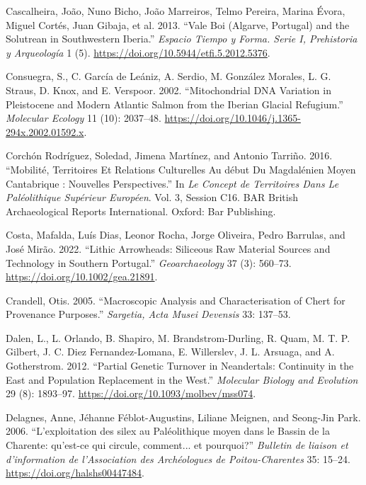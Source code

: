 \documentclass[
  a4paper,
  DIV=11,
  numbers=noendperiod]{scrreprt}
\newlength{\cslhangindent}
\newenvironment{CSLReferences}[2] %
 {\begin{list}{}{%
  \setlength{\itemindent}{0pt}
  \setlength{\leftmargin}{0pt}
  \setlength{\parsep}{0pt}
  \ifodd #1
   \setlength{\leftmargin}{\cslhangindent}
   \setlength{\itemindent}{-1\cslhangindent}
  \fi
  \setlength{\itemsep}{#2\baselineskip}}}
 {\end{list}}
\begin{document}
\begin{CSLReferences}{1}{0}
Cascalheira, João, Nuno Bicho, João Marreiros, Telmo Pereira, Marina
Évora, Miguel Cortés, Juan Gibaja, et al. 2013. {``Vale {Boi}
({Algarve}, {Portugal}) and the {Solutrean} in {Southwestern Iberia}.''}
\emph{Espacio Tiempo y Forma. Serie I, Prehistoria y Arqueolog{í}a} 1
(5). \url{https://doi.org/10.5944/etfi.5.2012.5376}.

Consuegra, S., C. García de Leániz, A. Serdio, M. González Morales, L.
G. Straus, D. Knox, and E. Verspoor. 2002. {``Mitochondrial {DNA}
Variation in {Pleistocene} and Modern {Atlantic} Salmon from the
{Iberian} Glacial Refugium.''} \emph{Molecular Ecology} 11 (10):
2037--48. \url{https://doi.org/10.1046/j.1365-294x.2002.01592.x}.

Corchón Rodríguez, Soledad, Jimena Martínez, and Antonio Tarriño. 2016.
{``Mobilit{é}, Territoires Et Relations Culturelles Au d{é}but Du
{Magdal{é}nien} Moyen Cantabrique : Nouvelles Perspectives.''} In
\emph{Le Concept de Territoires Dans Le {Pal{é}olithique} Sup{é}rieur
Europ{é}en}. Vol. 3, Session C16. {BAR British Archaeological Reports
International}. Oxford: Bar Publishing.

Costa, Mafalda, Luís Dias, Leonor Rocha, Jorge Oliveira, Pedro Barrulas,
and José Mirão. 2022. {``Lithic Arrowheads: {Siliceous} Raw Material
Sources and Technology in {Southern Portugal}.''} \emph{Geoarchaeology}
37 (3): 560--73. \url{https://doi.org/10.1002/gea.21891}.

Crandell, Otis. 2005. {``Macroscopic {Analysis} and {Characterisation}
of {Chert} for {Provenance Purposes}.''} \emph{Sargetia, Acta Musei
Devensis} 33: 137--53.

Dalen, L., L. Orlando, B. Shapiro, M. Brandstrom-Durling, R. Quam, M. T.
P. Gilbert, J. C. Diez Fernandez-Lomana, E. Willerslev, J. L. Arsuaga,
and A. Gotherstrom. 2012. {``Partial {Genetic Turnover} in
{Neandertals}: {Continuity} in the {East} and {Population Replacement}
in the {West}.''} \emph{Molecular Biology and Evolution} 29 (8):
1893--97. \url{https://doi.org/10.1093/molbev/mss074}.

Delagnes, Anne, Jéhanne Féblot-Augustins, Liliane Meignen, and Seong-Jin
Park. 2006. {``{L'exploitation des silex au Pal{é}olithique moyen dans
le Bassin de la Charente: qu'est-ce qui circule, comment... et
pourquoi?}''} \emph{Bulletin de liaison et d'information de
l'Association des Arch{é}ologues de Poitou-Charentes} 35: 15--24.
\url{https://doi.org/halshs00447484}.


\end{CSLReferences}
\end{document}
